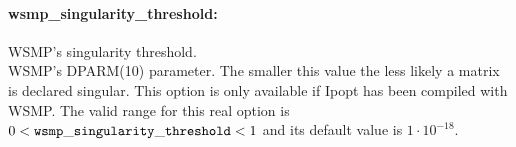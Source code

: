 \paragraph{wsmp\_singularity\_threshold:}\label{sec:wsmp_singularity_threshold} WSMP's singularity threshold. $\;$ \\
 WSMP's DPARM(10) parameter.  The smaller this
value the less likely a matrix is declared
singular.  This option is only available if Ipopt
has been compiled with WSMP. The valid range for this real option is 
$0 <  {\tt wsmp\_singularity\_threshold } <  1$
and its default value is $1 \cdot 10^{-18}$.
